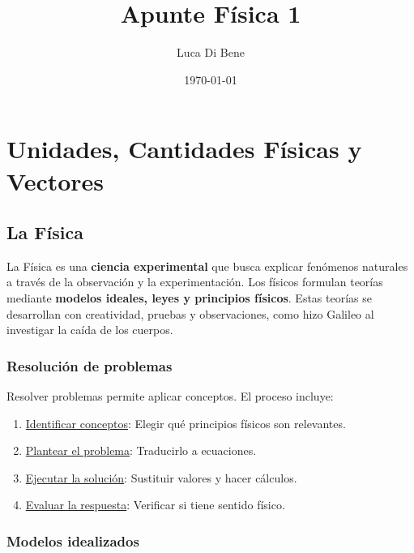 \documentclass{article}
\title{Apunte Física 1}
\author{Luca Di Bene}
\date{\today}
\newcommand{\newsection}[1]{
    \pagebreak
    {\color{sectionColor}
    \centering
    \section{\bl{#1}}}
    \color{black}
    \vspace{0.5cm}
}
\newcommand{\newsubsection}[1]{
    \vspace{0.5cm}
    \color{sectionColor}
    \subsection{\bl{#1}}
    \color{black}
    \vspace{0.5cm}
}
\newcommand{\newtitle}[1]{
    \color{titleColor}
    \subsubsection{#1}
    \color{black}
}
\newcommand{\bl}[1]{\textbf{#1}}
\begin{document}
    \maketitle
    \tableofcontents
    \newpage

    \newsection{Unidades, Cantidades Físicas y Vectores}


    \newsubsection{La Física}

    \par La Física es una \bl{ciencia experimental} que busca explicar fenómenos naturales a través de la observación y la experimentación. Los físicos formulan teorías mediante \bl{modelos ideales, leyes y principios físicos}. Estas teorías se desarrollan con creatividad, pruebas y observaciones, como hizo Galileo al investigar la caída de los cuerpos.

    \newtitle{Resolución de problemas}

    \par Resolver problemas permite aplicar conceptos. El proceso incluye:

    \begin{enumerate}
        \item \underline{Identificar conceptos}: Elegir qué principios físicos son relevantes.
        \item \underline{Plantear el problema}: Traducirlo a ecuaciones.
        \item \underline{Ejecutar la solución}: Sustituir valores y hacer cálculos.
        \item \underline{Evaluar la respuesta}: Verificar si tiene sentido físico.
    \end{enumerate} 

    \newtitle{Modelos idealizados}
    
\end{document}
